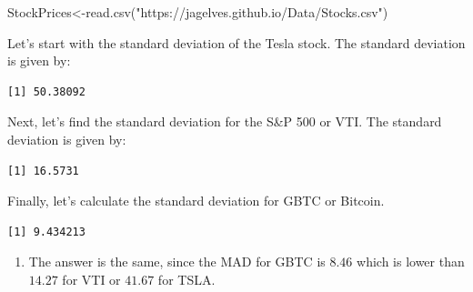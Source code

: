 \documentclass[
  letterpaper,
  DIV=11,
  numbers=noendperiod]{scrreprt}
\newenvironment{Shaded}{\begin{snugshade}}{\end{snugshade}}
\newcommand{\FunctionTok}[1]{\textcolor[rgb]{0.28,0.35,0.67}{#1}}
\newcommand{\NormalTok}[1]{\textcolor[rgb]{0.00,0.23,0.31}{#1}}
\newcommand{\OtherTok}[1]{\textcolor[rgb]{0.00,0.23,0.31}{#1}}
\newcommand{\SpecialCharTok}[1]{\textcolor[rgb]{0.37,0.37,0.37}{#1}}
\newcommand{\StringTok}[1]{\textcolor[rgb]{0.13,0.47,0.30}{#1}}
\providecommand{\tightlist}{%
  \setlength{\itemsep}{0pt}\setlength{\parskip}{0pt}}\usepackage{longtable,booktabs,array}
\begin{document}
\begin{Shaded}
\begin{Highlighting}[numbers=left,,]
\NormalTok{StockPrices}\OtherTok{\textless{}{-}}\FunctionTok{read.csv}\NormalTok{(}\StringTok{"https://jagelves.github.io/Data/Stocks.csv"}\NormalTok{)}
\end{Highlighting}
\end{Shaded}

Let's start with the standard deviation of the Tesla stock. The standard
deviation is given by:

\begin{Shaded}
\end{Shaded}

\begin{verbatim}
[1] 50.38092
\end{verbatim}

Next, let's find the standard deviation for the S\&P 500 or VTI. The
standard deviation is given by:

\begin{Shaded}
\end{Shaded}

\begin{verbatim}
[1] 16.5731
\end{verbatim}

Finally, let's calculate the standard deviation for GBTC or Bitcoin.

\begin{Shaded}
\end{Shaded}

\begin{verbatim}
[1] 9.434213
\end{verbatim}

\begin{enumerate}
\def\labelenumi{\arabic{enumi}.}
\setcounter{enumi}{1}
\tightlist
\item
  The answer is the same, since the MAD for GBTC is \(8.46\) which is
  lower than \(14.27\) for VTI or \(41.67\) for TSLA.
\end{enumerate}
\end{document}
